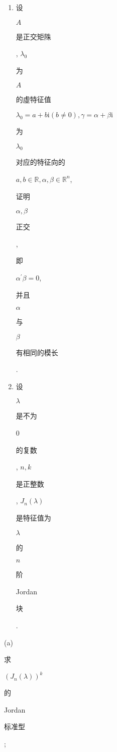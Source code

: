 \documentclass[10pt]{article}
\begin{document}
\begin{enumerate}
  \item \begin{CJK}{UTF8}{mj}设\end{CJK} $A$ \begin{CJK}{UTF8}{mj}是正交矩陎\end{CJK}, $\lambda_{0}$ \begin{CJK}{UTF8}{mj}为\end{CJK} $A$ \begin{CJK}{UTF8}{mj}的虛特征值\end{CJK} $\lambda_{0}=a+b \mathrm{i}(b \neq 0), \gamma=\alpha+\beta \mathrm{i}$ \begin{CJK}{UTF8}{mj}为\end{CJK} $\lambda_{0}$ \begin{CJK}{UTF8}{mj}对应的特征向的\end{CJK} $a, b \in \mathbb{R}, \alpha, \beta \in \mathbb{R}^{n}$, \begin{CJK}{UTF8}{mj}证明\end{CJK} $\alpha, \beta$ \begin{CJK}{UTF8}{mj}正交\end{CJK}, \begin{CJK}{UTF8}{mj}即\end{CJK} $\alpha^{\prime} \beta=0$, \begin{CJK}{UTF8}{mj}并且\end{CJK} $\alpha$ \begin{CJK}{UTF8}{mj}与\end{CJK} $\beta$ \begin{CJK}{UTF8}{mj}有相同的模长\end{CJK}.

  \item \begin{CJK}{UTF8}{mj}设\end{CJK} $\lambda$ \begin{CJK}{UTF8}{mj}是不为\end{CJK} 0 \begin{CJK}{UTF8}{mj}的复数\end{CJK}, $n, k$ \begin{CJK}{UTF8}{mj}是正整数\end{CJK}, $J_{n}(\lambda)$ \begin{CJK}{UTF8}{mj}是特征值为\end{CJK} $\lambda$ \begin{CJK}{UTF8}{mj}的\end{CJK} $n$ \begin{CJK}{UTF8}{mj}阶\end{CJK} Jordan \begin{CJK}{UTF8}{mj}块\end{CJK}.

\end{enumerate}
(a) \begin{CJK}{UTF8}{mj}求\end{CJK} $\left(J_{n}(\lambda)\right)^{k}$ \begin{CJK}{UTF8}{mj}的\end{CJK} Jordan \begin{CJK}{UTF8}{mj}标准型\end{CJK};
\end{document}
